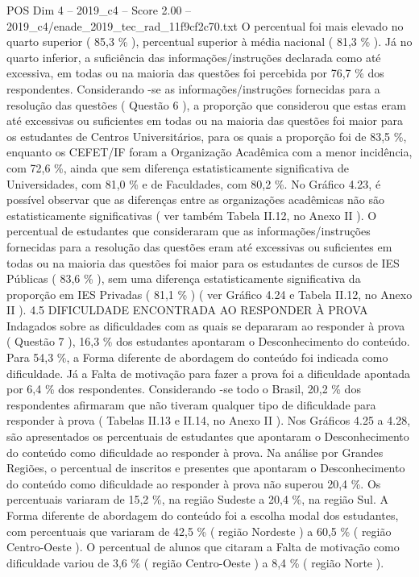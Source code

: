 \begin{textsample}{POS Dim 4 – 2019\_c4 – Score 2.00 – 2019\_c4/enade\_2019\_tec\_rad\_11f9cf2c70.txt}
O percentual foi mais elevado no quarto superior ( 85,3 \% ), percentual superior à média nacional ( 81,3 \% ).
Já no quarto inferior, a suficiência das informações/instruções declarada como até excessiva, em todas ou na maioria das questões foi percebida por 76,7 \% dos respondentes.
Considerando -se as informações/instruções fornecidas para a resolução das questões ( Questão 6 ), a proporção que considerou que estas eram até excessivas ou suficientes em todas ou na maioria das questões foi maior para os estudantes de Centros Universitários, para os quais a proporção foi de 83,5 \%, enquanto os CEFET/IF foram a Organização Acadêmica com a menor incidência, com 72,6 \%, ainda que sem diferença estatisticamente significativa de Universidades, com 81,0 \% e de Faculdades, com 80,2 \%.
No Gráfico 4.23, é possível observar que as diferenças entre as organizações acadêmicas não são estatisticamente significativas ( ver também Tabela II.12, no Anexo II ).
O percentual de estudantes que consideraram que as informações/instruções fornecidas para a resolução das questões eram até excessivas ou suficientes em todas ou na maioria das questões foi maior para os estudantes de cursos de IES Públicas ( 83,6 \% ), sem uma diferença estatisticamente significativa da proporção em IES Privadas ( 81,1 \% ) ( ver Gráfico 4.24 e Tabela II.12, no Anexo II ). 4.5 DIFICULDADE ENCONTRADA AO RESPONDER À PROVA Indagados sobre as dificuldades com as quais se depararam ao responder à prova ( Questão 7 ), 16,3 \% dos estudantes apontaram o Desconhecimento do conteúdo.
Para 54,3 \%, a Forma diferente de abordagem do conteúdo foi indicada como dificuldade.
Já a Falta de motivação para fazer a prova foi a dificuldade apontada por 6,4 \% dos respondentes.
Considerando -se todo o Brasil, 20,2 \% dos respondentes afirmaram que não tiveram qualquer tipo de dificuldade para responder à prova ( Tabelas II.13 e II.14, no Anexo II ).
Nos Gráficos 4.25 a 4.28, são apresentados os percentuais de estudantes que apontaram o Desconhecimento do conteúdo como dificuldade ao responder à prova.
Na análise por Grandes Regiões, o percentual de inscritos e presentes que apontaram o Desconhecimento do conteúdo como dificuldade ao responder à prova não superou 20,4 \%.
Os percentuais variaram de 15,2 \%, na região Sudeste a 20,4 \%, na região Sul.
A Forma diferente de abordagem do conteúdo foi a escolha modal dos estudantes, com percentuais que variaram de 42,5 \% ( região Nordeste ) a 60,5 \% ( região Centro-Oeste ).
O percentual de alunos que citaram a Falta de motivação como dificuldade variou de 3,6 \% ( região Centro-Oeste ) a 8,4 \% ( região Norte ).

\end{textsample}
